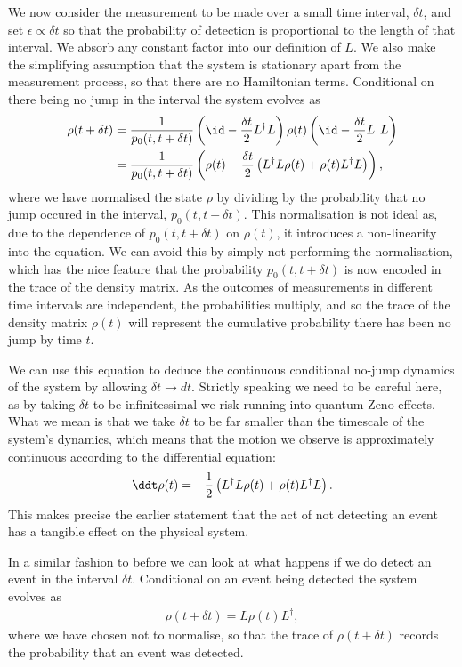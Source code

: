 We now consider the measurement to be made over a small time interval, $\delta t$, and set $\epsilon \propto \delta t$ so that the probability of detection is proportional to the length of that interval. We absorb any constant factor into our definition of $L$. We also make the simplifying assumption that the system is stationary apart from the measurement process, so that there are no Hamiltonian terms. Conditional on there being no jump in the interval the system evolves as
\begin{align}
  \rho(t+\delta t) &= \frac{1}{p_0(t, t+\delta t)}\left(\id - \frac{\delta t}{2} L^\dagger L\right)\rho(t)\left(\id - \frac{\delta t}{2} L^\dagger L\right) \\
  &= \frac{1}{p_0(t, t+\delta t)}\left(\rho(t) - \frac{\delta t}{2} \left(L^\dagger L \rho(t) + \rho(t) L^\dagger L \right)\right),
\end{align}
where we have normalised the state $\rho$ by dividing by the probability that no jump occured in the interval, $p_0(t, t+\delta t)$. This normalisation is not ideal as, due to the dependence of $p_0(t, t+\delta t)$ on $\rho(t)$, it introduces a non-linearity into the equation. We can avoid this by simply not performing the normalisation, which has the nice feature that the probability $p_0(t, t+\delta t)$ is now encoded in the trace of the density matrix. As the outcomes of measurements in different time intervals are independent, the probabilities multiply, and so the trace of the density matrix $\rho(t)$ will represent the cumulative probability there has been no jump by time $t$.

We can use this equation to deduce the continuous conditional no-jump dynamics of the system by allowing $\delta t \rightarrow dt$. Strictly speaking we need to be careful here, as by taking $\delta t$ to be infinitessimal we risk running into quantum Zeno effects. What we mean is that we take $\delta t$ to be far smaller than the timescale of the system's dynamics, which means that the motion we observe is approximately continuous according to the differential equation:
\begin{align}
  \ddt \rho(t) = - \frac{1}{2} \left(L^\dagger L \rho(t) + \rho(t) L^\dagger L \right).
\end{align}
This makes precise the earlier statement that the act of not detecting an event has a tangible effect on the physical system.

In a similar fashion to before we can look at what happens if we do detect an event in the interval $\delta t$. Conditional on an event being detected the system evolves as
\begin{align}
  \rho(t + \delta t) = L\rho(t)L^\dagger,
\end{align}
where we have chosen not to normalise, so that the trace of $\rho(t + \delta t)$ records the probability that an event was detected.

